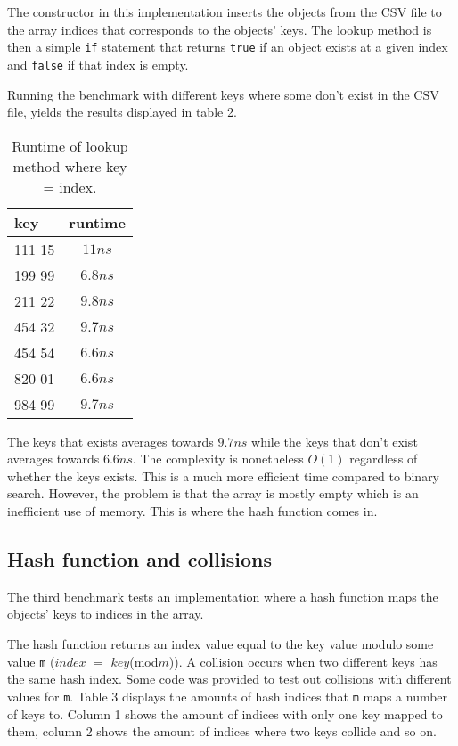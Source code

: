 \documentclass[a4paper,11pt]{article}
\begin{document}
The constructor in this implementation inserts the objects from the CSV 
file to the array indices that corresponds to the objects' keys. The 
lookup method is then a simple {\tt if} statement that returns {\tt true} 
if an object exists at a given index and {\tt false} if that index is 
empty.

Running the benchmark with different keys where some don't exist in  
the CSV file, yields the results displayed in table 2.

\begin{table}[ht]
  \begin{center}
  \begin{tabular}{l|c}
  \textbf{key} & \textbf{runtime} \\
  \hline
    111 15  & $ 11 ns$  \\
    199 99  & $ 6.8 ns$ \\
    211 22  & $ 9.8 ns$ \\
    454 32  & $ 9.7 ns$ \\
    454 54  & $ 6.6 ns$ \\
    820 01  & $ 6.6 ns$ \\
    984 99  & $ 9.7 ns$ \\
  \end{tabular}
  \caption{Runtime of lookup method where key = index.}
  \label{tab:table2}
  \end{center}
\end{table}

The keys that exists averages towards $ 9.7 ns$ while the keys that
don't exist averages towards $ 6.6 ns$. The complexity is nonetheless
$ O(1)$ regardless of whether the keys exists. This is a much more 
efficient time compared to binary search. However, the problem is that
the array is mostly empty which is an inefficient use of memory. This
is where the hash function comes in.

\subsection*{Hash function and collisions}

The third benchmark tests an implementation where a hash function maps
the objects' keys to indices in the array.

The hash function returns an index value equal to the key value modulo 
some value {\tt m} ($index$ $=$ $key$(mod$m$)). A collision occurs 
when two different keys has the same hash index. Some code was provided 
to test out collisions with different values for {\tt m}. Table 3 
displays the amounts of hash indices that {\tt m} maps a number of keys to. 
Column 1 shows the amount of indices with only one key mapped to them, 
column 2 shows the amount of indices where two keys collide and so on.
\end{document}
